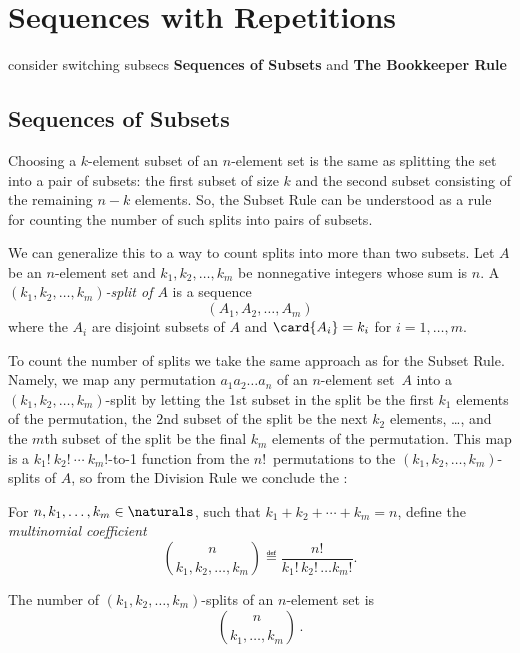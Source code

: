 \section{Sequences with Repetitions}\label{bookkeeper_sec}

\begin{editingnotes}
consider switching subsecs \textbf{Sequences of Subsets} and \textbf{The Bookkeeper Rule}
\end{editingnotes}

\subsection{Sequences of Subsets}

Choosing a $k$-element subset of an $n$-element set is the same as
splitting the set into a pair of subsets: the first subset of size $k$ and
the second subset consisting of the remaining $n-k$ elements.  So, the
Subset Rule can be understood as a rule for counting the number of such
splits into pairs of subsets.

We can generalize this to a way to count splits into more than two
subsets.  Let $A$ be an $n$-element set and $k_1,k_2, \dots,
k_m$ be nonnegative integers whose sum is $n$.  A \emph{$(k_1,k_2,
  \dots, k_m)$-split of $A$} is a sequence
\[
(A_1, A_2,\dots,A_m)
\]
where the $A_i$ are disjoint subsets of $A$ and $\card{A_i} = k_i$ for
$i=1,\dots,m$.

To count the number of splits we take the same approach as for the
Subset Rule.  Namely, we map any permutation $a_1a_2\dots a_n$ of an
$n$-element set~$A$ into a $(k_1,k_2, \dots, k_m)$-split by letting
the 1st subset in the split be the first $k_1$ elements of the
permutation, the 2nd subset of the split be the next $k_2$ elements,
\dots, and the $m$th subset of the split be the final $k_m$ elements
of the permutation.  This map is a
\hbox{$k_1!\ k_2!\ \cdots\ k_m!$-to-1} function from the
$n!$~permutations to the $(k_1,k_2, \dots, k_m)$-splits of $A$, so
from the Division Rule we conclude the :

\begin{definition}
For $n,k_1,\dots,k_m \in \naturals$, such that $k_1+k_2+\cdots+k_m = n$,
define the \emph{multinomial coefficient}%
\[
\binom{n}{k_1, k_2, \dots, k_m} \eqdef \frac{n!}{k_1!\, k_2!\, \dots k_m!}.
\]
\end{definition}

\begin{rul}
The number of $(k_1,k_2, \dots, k_m)$-splits of an $n$-element set is
\[
\binom{n}{k_1,\dots,k_m}\,.
\]
\end{rul}


